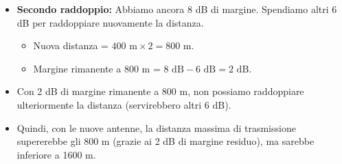 \begin{itemize}
\begin{itemize}
        \item \textbf{Secondo raddoppio:} Abbiamo ancora 8 dB di margine. Spendiamo altri 6 dB per raddoppiare nuovamente la distanza.
        \begin{itemize}
            \item Nuova distanza = $400 \text{ m} \times 2 = 800 \text{ m}$.
            \item Margine rimanente a 800 m = $8 \text{ dB} - 6 \text{ dB} = 2 \text{ dB}$.
        \end{itemize}
        \item Con 2 dB di margine rimanente a 800 m, non possiamo raddoppiare ulteriormente la distanza (servirebbero altri 6 dB).
        \item Quindi, con le nuove antenne, la distanza massima di trasmissione supererebbe gli 800 m (grazie ai 2 dB di margine residuo), ma sarebbe inferiore a 1600 m.
    \end{itemize}
\end{itemize}

